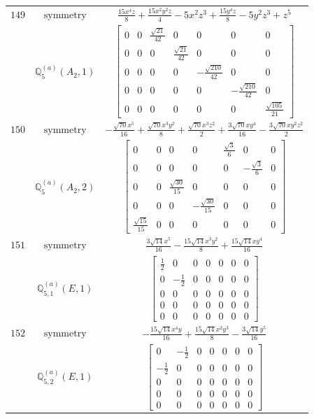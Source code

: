 \documentclass[fleqn,8pt,landscape]{jsarticle}
\begin{document}
\begin{longtable}{ccc}
$ 149 $ & $ \text{symmetry} $ & $ \frac{15 x^{4} z}{8} + \frac{15 x^{2} y^{2} z}{4} - 5 x^{2} z^{3} + \frac{15 y^{4} z}{8} - 5 y^{2} z^{3} + z^{5} $ \\
$  $ & $ \mathbb{Q}_{5}^{(a)}(A_{2},1) $ & $ \begin{bmatrix} 0 & 0 & \frac{\sqrt{21}}{42} & 0 & 0 & 0 & 0 \\ 0 & 0 & 0 & \frac{\sqrt{21}}{42} & 0 & 0 & 0 \\ 0 & 0 & 0 & 0 & - \frac{\sqrt{210}}{42} & 0 & 0 \\ 0 & 0 & 0 & 0 & 0 & - \frac{\sqrt{210}}{42} & 0 \\ 0 & 0 & 0 & 0 & 0 & 0 & \frac{\sqrt{105}}{21} \end{bmatrix} $ \\ \hline
$ 150 $ & $ \text{symmetry} $ & $ - \frac{\sqrt{70} x^{5}}{16} + \frac{\sqrt{70} x^{3} y^{2}}{8} + \frac{\sqrt{70} x^{3} z^{2}}{2} + \frac{3 \sqrt{70} x y^{4}}{16} - \frac{3 \sqrt{70} x y^{2} z^{2}}{2} $ \\
$  $ & $ \mathbb{Q}_{5}^{(a)}(A_{2},2) $ & $ \begin{bmatrix} 0 & 0 & 0 & 0 & \frac{\sqrt{3}}{6} & 0 & 0 \\ 0 & 0 & 0 & 0 & 0 & - \frac{\sqrt{3}}{6} & 0 \\ 0 & 0 & \frac{\sqrt{30}}{15} & 0 & 0 & 0 & 0 \\ 0 & 0 & 0 & - \frac{\sqrt{30}}{15} & 0 & 0 & 0 \\ \frac{\sqrt{15}}{15} & 0 & 0 & 0 & 0 & 0 & 0 \end{bmatrix} $ \\ \hline
$ 151 $ & $ \text{symmetry} $ & $ \frac{3 \sqrt{14} x^{5}}{16} - \frac{15 \sqrt{14} x^{3} y^{2}}{8} + \frac{15 \sqrt{14} x y^{4}}{16} $ \\
$  $ & $ \mathbb{Q}_{5,1}^{(a)}(E,1) $ & $ \begin{bmatrix} \frac{1}{2} & 0 & 0 & 0 & 0 & 0 & 0 \\ 0 & - \frac{1}{2} & 0 & 0 & 0 & 0 & 0 \\ 0 & 0 & 0 & 0 & 0 & 0 & 0 \\ 0 & 0 & 0 & 0 & 0 & 0 & 0 \\ 0 & 0 & 0 & 0 & 0 & 0 & 0 \end{bmatrix} $ \\ \hline
$ 152 $ & $ \text{symmetry} $ & $ - \frac{15 \sqrt{14} x^{4} y}{16} + \frac{15 \sqrt{14} x^{2} y^{3}}{8} - \frac{3 \sqrt{14} y^{5}}{16} $ \\
$  $ & $ \mathbb{Q}_{5,2}^{(a)}(E,1) $ & $ \begin{bmatrix} 0 & - \frac{1}{2} & 0 & 0 & 0 & 0 & 0 \\ - \frac{1}{2} & 0 & 0 & 0 & 0 & 0 & 0 \\ 0 & 0 & 0 & 0 & 0 & 0 & 0 \\ 0 & 0 & 0 & 0 & 0 & 0 & 0 \\ 0 & 0 & 0 & 0 & 0 & 0 & 0 \end{bmatrix} $ \\ \hline

\end{longtable}
\end{document}
